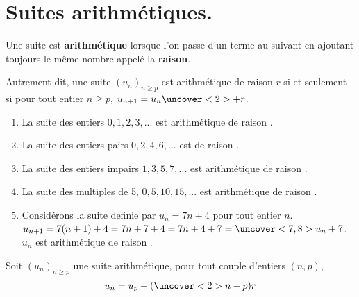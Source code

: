\documentclass{beamer}
\begin{document}
  \section{Suites arithmétiques.}
  
  \begin{frame}
  \begin{definition} 
    
   Une suite est \textbf{arithmétique} lorsque l'on passe d'un terme au suivant en ajoutant toujours le même nombre
   appelé la \textbf{raison}.
   
   Autrement dit, une suite $(u_n)_{n \geq p}$ est arithmétique de raison $r$ si et seulement si 
   pour tout entier $n \geq p$, $u_{n+1}=u_n \uncover<2>{+r}$.
   \end{definition}
   
   \end{frame}
   
   \begin{frame}
   \begin{example}
    
  \begin{enumerate}
   \item La suite des entiers $0,1,2,3,...$ est arithmétique de raison .
   \item La suite des entiers pairs $0,2,4,6,...$ est 
   de raison .
   \item La suite des entiers impairs $1,3,5,7,...$ est arithmétique de raison .
   \item La suite des multiples de 5, $0,5,10,15,...$ est arithmétique de raison .
   \item Considérons la suite definie par $u_n=7n+4$ pour tout entier $n$. 
   $u_{n+1}=7(n+1)+4=7n+7+4=7n+4+7=\uncover<7,8>{u_n}+7$. $u_n$ est arithmétique de raison .
  \end{enumerate}  
   \end{example}
   \end{frame}
   
   \begin{frame}
   \begin{theorem}
    Soit $(u_n)_{n \geq p}$ une suite arithmétique, pour tout couple d'entiers $(n,p)$,
    $$u_n=u_p+(\uncover<2>{n-p})r$$
   \end{theorem}
   \end{frame}
   
\end{document}
